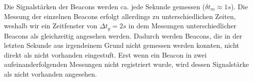 Die Signalstärken der Beacons werden ca. jede Sekunde gemessen ($\delta t_m \approx 1s$).
Die Messung der einzelnen Beacons erfolgt allerdings zu unterschiedlichen Zeiten,
weshalb wir ein Zeitfenster von $\Delta t_g = 2s$ in dem Messungen unterschiedlicher
Beacons als gleichzeitig angesehen werden. Dadurch werden Beacons, die in der letzten Sekunde aus irgendeinem Grund nicht gemessen werden konnten, nicht direkt als nicht vorhanden eingestuft.
Erst wenn ein Beacon in zwei aufeinanderfolgenden Messungen nicht registriert wurde, wird dessen Signalstärke als nicht vorhanden angesehen.

